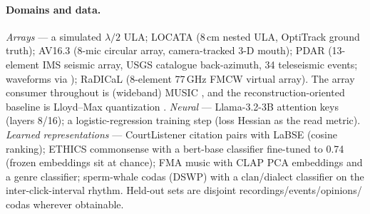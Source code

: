 \documentclass[10pt]{article} %
\theoremstyle{remark}
\begin{document}
\paragraph{Domains and data.} \emph{Arrays} --- a simulated $\lambda/2$ ULA; LOCATA
\citep{evers2020locata} (8\,cm nested ULA, OptiTrack ground truth); AV16.3
\citep{lathoud2004av163} (8-mic circular array, camera-tracked 3-D mouth); PDAR (13-element
IMS seismic array, USGS catalogue back-azimuth, 34 teleseismic events; waveforms via
\citealp{iris}); RaDICaL \citep{lim2021radical} (8-element 77\,GHz FMCW virtual array).
The array consumer throughout is (wideband) MUSIC \citep{schmidt1986music}, and the
reconstruction-oriented baseline is Lloyd--Max quantization \citep{lloyd1982}. \emph{Neural}
--- Llama-3.2-3B \citep{grattafiori2024llama3} attention keys (layers 8/16); a
logistic-regression training step (loss Hessian as the read metric). \emph{Learned
representations} --- CourtListener \citep{courtlistener} citation pairs with LaBSE
\citep{feng2022labse} (cosine ranking); ETHICS commonsense \citep{hendrycks2021ethics} with
a bert-base classifier fine-tuned to 0.74 (frozen embeddings sit at chance); FMA music
\citep{defferrard2017fma} with CLAP \citep{wu2023clap} PCA embeddings and a genre
classifier; sperm-whale codas \citep{sharma2024codas} (DSWP) with a clan/dialect classifier
on the inter-click-interval rhythm. Held-out sets are disjoint recordings/events/opinions/
codas wherever obtainable.
\end{document}

